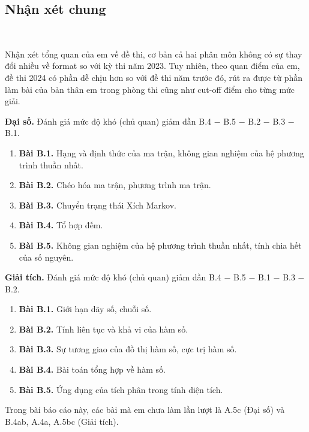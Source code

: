 \subsection{Nhận xét chung}
~

Nhận xét tổng quan của em về đề thi, cơ bản cả hai phân môn không có sự thay đổi nhiều về format so với kỳ thi năm 2023. Tuy nhiên, theo quan điểm của em, đề thi 2024 có phần dễ chịu hơn so với đề thi năm trước đó, rút ra được từ phần làm bài của bản thân em trong phòng thi cũng như cut-off điểm cho từng mức giải. 

\textbf{Đại số. } Đánh giá mức độ khó (chủ quan) giảm dần B.4 $-$ B.5 $-$ B.2 $-$ B.3 $-$ B.1.
    \begin{enumerate}
        \item[] {\textbf{Bài B.1.} Hạng và định thức của ma trận, không gian nghiệm của hệ phương trình thuần nhất.}
        \item[] {\textbf{Bài B.2.} Chéo hóa ma trận, phương trình ma trận.}
        \item[] {\textbf{Bài B.3.} Chuyển trạng thái Xích Markov.}
        \item[] {\textbf{Bài B.4.} Tổ hợp đếm.}
        \item[] {\textbf{Bài B.5.} Không gian nghiệm của hệ phương trình thuần nhất, tính chia hết của số nguyên.}
    \end{enumerate}

\textbf{Giải tích. } Đánh giá mức độ khó (chủ quan) giảm dần B.4 $-$ B.5 $-$ B.1 $-$ B.3 $-$ B.2.
    \begin{enumerate}
        \item[] {\textbf{Bài B.1.} Giới hạn dãy số, chuỗi số.}
        \item[] {\textbf{Bài B.2.} Tính liên tục và khả vi của hàm số.}
        \item[] {\textbf{Bài B.3.} Sự tương giao của đồ thị hàm số, cực trị hàm số.}
        \item[] {\textbf{Bài B.4.} Bài toán tổng hợp về hàm số.}
        \item[] {\textbf{Bài B.5.} Ứng dụng của tích phân trong tính diện tích.}
    \end{enumerate}

Trong bài báo cáo này, các bài mà em chưa làm lần lượt là A.5c (Đại số) và B.4ab, A.4a, A.5bc (Giải tích).